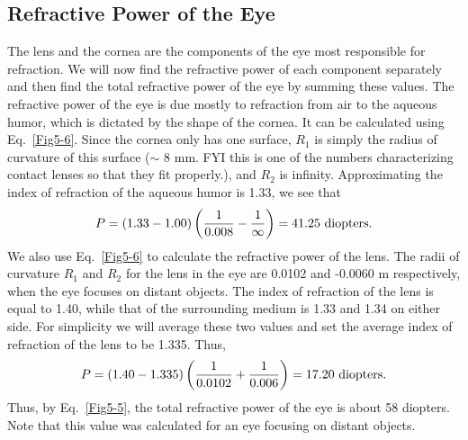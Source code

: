 \subsection{Refractive Power of the Eye}

The lens and the cornea are the components of the eye most responsible for refraction.  We will now find the refractive power of each component separately and then find the total refractive power of the eye by summing these values.
The refractive power of the eye is due mostly to refraction from air to the aqueous humor, which is dictated by the shape of the cornea.  It can be calculated using Eq.~\ref{Fig5-6}.  Since the cornea only has one surface, $R_1$ is simply the radius of curvature of this surface ($\sim$ 8 mm. FYI this is one of the numbers characterizing contact lenses so that they fit properly.), and $R_2$ is infinity.  Approximating the index of refraction of the aqueous humor is 1.33, we see that 
$$P = \left(1.33 - 1.00\right)\left(\frac{1}{0.008}-\frac{1}{\infty}\right) = 41.25~{\rm diopters}.$$
We also use Eq.~\ref{Fig5-6} to calculate the refractive power of the lens.  The radii of curvature $R_1$ and $R_2$ for the lens in the eye are 0.0102 and -0.0060 m respectively, when the eye focuses on distant objects. The index of refraction of the lens is equal to 1.40, while that of the surrounding medium is 1.33 and 1.34 on either side. For simplicity we will average these two values and set the average index of refraction of the lens to be 1.335. Thus,  
$$P = \left(1.40 - 1.335\right)\left(\frac{1}{0.0102}+\frac{1}{0.006}\right) = 17.20~{\rm diopters}.$$
Thus, by Eq.~\ref{Fig5-5}, the total refractive power of the eye is about 58 diopters.  Note that this value was calculated for an eye focusing on distant objects.

